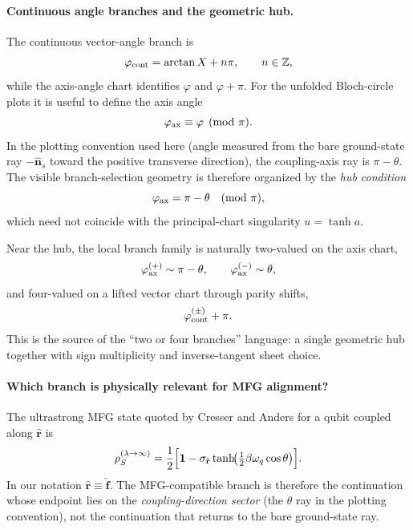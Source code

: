 \paragraph{Continuous angle branches and the geometric hub.}
The continuous vector-angle branch is
\begin{equation}
    \varphi_{\rm cont}=\arctan X+n\pi,
    \qquad n\in\mathbb Z,
    \label{eq:tilt_sign_branch_phi_cont}
\end{equation}
while the axis-angle chart identifies $\varphi$ and $\varphi+\pi$.  For the unfolded Bloch-circle plots it is
useful to define the axis angle
\begin{equation}
    \varphi_{\rm ax}\equiv \varphi \pmod{\pi}.
\end{equation}
In the plotting convention used here (angle measured from the bare ground-state ray $-\hat{\mathbf n}_s$ toward
the positive transverse direction), the coupling-axis ray is $\pi-\theta$.  The visible branch-selection geometry
is therefore organized by the \emph{hub condition}
\begin{equation}
    \varphi_{\rm ax}=\pi-\theta \quad (\mathrm{mod}\ \pi),
    \label{eq:tilt_sign_branch_hub_condition}
\end{equation}
which need not coincide with the principal-chart singularity $u=\tanh a$.

Near the hub, the local branch family is naturally two-valued on the axis chart,
\begin{equation}
    \varphi_{\rm ax}^{(+)}\sim \pi-\theta,
    \qquad
    \varphi_{\rm ax}^{(-)}\sim \theta,
    \label{eq:tilt_sign_branch_two_images}
\end{equation}
and four-valued on a lifted vector chart through parity shifts,
\begin{equation}
    \varphi_{\rm cont}^{(\pm)}+\pi.
    \label{eq:tilt_sign_branch_four_images}
\end{equation}
This is the source of the ``two or four branches'' language: a single geometric hub together with sign
multiplicity and inverse-tangent sheet choice.

\paragraph{Which branch is physically relevant for MFG alignment?}
The ultrastrong MFG state quoted by Cresser and Anders for a qubit coupled along $\hat{\mathbf r}$ is
\begin{equation}
    \rho_S^{(\lambda\to\infty)}
    =
    \frac12\Bigl[\mathbf 1-\sigma_{\hat{\mathbf r}}
    \tanh\!\bigl(\tfrac12\beta\omega_q\cos\theta\bigr)\Bigr].
    \label{eq:tilt_sign_branch_cresser_anders_mfg}
\end{equation}
In our notation $\hat{\mathbf r}\equiv \hat{\mathbf f}$.  The MFG-compatible branch is therefore the
continuation whose endpoint lies on the \emph{coupling-direction sector} (the $\theta$ ray in the plotting
convention), not the continuation that returns to the bare ground-state ray.

